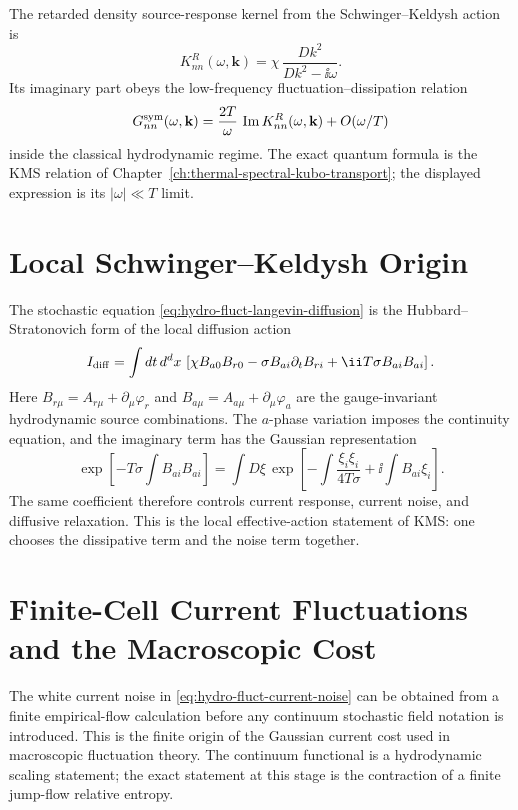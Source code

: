 The retarded density source-response kernel from the Schwinger--Keldysh
action is
\begin{equation}
  K^R_{nn}(\omega,\mathbf k)
  =
  \chi\,\frac{Dk^2}{Dk^2-\ii\omega}.
  \label{eq:hydro-fluct-diffusive-retarded}
\end{equation}
Its imaginary part obeys the low-frequency fluctuation--dissipation relation
\[
  G^{\rm sym}_{nn}(\omega,\mathbf k)
  =
  \frac{2T}{\omega}\,
  \operatorname{Im}K^R_{nn}(\omega,\mathbf k)
  +O(\omega/T)
\]
inside the classical hydrodynamic regime.  The exact quantum formula is the
KMS relation of Chapter~\ref{ch:thermal-spectral-kubo-transport}; the
displayed expression is its \(|\omega|\ll T\) limit.

\section{Local Schwinger--Keldysh Origin}

The stochastic equation \eqref{eq:hydro-fluct-langevin-diffusion} is the
Hubbard--Stratonovich form of the local diffusion action
\begin{equation}
  I_{\rm diff}
  =
  \int dt\,d^dx\,
  \left[
  \chi B_{a0}B_{r0}
  -\sigma B_{ai}\partial_tB_{ri}
  +\ii T\sigma B_{ai}B_{ai}
  \right].
  \label{eq:hydro-fluct-diffusion-sk-action}
\end{equation}
Here \(B_{r\mu}=A_{r\mu}+\partial_\mu\varphi_r\) and
\(B_{a\mu}=A_{a\mu}+\partial_\mu\varphi_a\) are the gauge-invariant
hydrodynamic source combinations.  The \(a\)-phase variation imposes the
continuity equation, and the imaginary term has the Gaussian representation
\[
  \exp\!\left[
    -T\sigma\int B_{ai}B_{ai}
  \right]
  =
  \int D\xi\,
  \exp\!\left[
    -\int\frac{\xi_i\xi_i}{4T\sigma}
    +\ii\int B_{ai}\xi_i
  \right].
\]
The same coefficient therefore controls current response, current noise, and
diffusive relaxation.  This is the local effective-action statement of KMS:
one chooses the dissipative term and the noise term together.

\section{Finite-Cell Current Fluctuations and the Macroscopic Cost}
\label{sec:hydro-fluct-finite-current-mft}

The white current noise in
\eqref{eq:hydro-fluct-current-noise} can be obtained from a finite
empirical-flow calculation before any continuum stochastic field notation is
introduced.  This is the finite origin of the Gaussian current cost used in
macroscopic fluctuation theory.  The continuum functional is a hydrodynamic
scaling statement; the exact statement at this stage is the contraction of a
finite jump-flow relative entropy.


